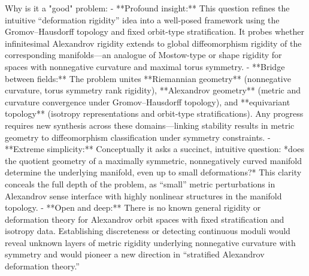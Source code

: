 Why is it a "good" problem:  
- **Profound insight:** This question refines the intuitive “deformation rigidity” idea into a well-posed framework using the Gromov–Hausdorff topology and fixed orbit-type stratification. It probes whether infinitesimal Alexandrov rigidity extends to global diffeomorphism rigidity of the corresponding manifolds—an analogue of Mostow-type or shape rigidity for spaces with nonnegative curvature and maximal torus symmetry.  
- **Bridge between fields:** The problem unites **Riemannian geometry** (nonnegative curvature, torus symmetry rank rigidity), **Alexandrov geometry** (metric and curvature convergence under Gromov–Hausdorff topology), and **equivariant topology** (isotropy representations and orbit-type stratifications). Any progress requires new synthesis across these domains—linking stability results in metric geometry to diffeomorphism classification under symmetry constraints.  
- **Extreme simplicity:** Conceptually it asks a succinct, intuitive question: *does the quotient geometry of a maximally symmetric, nonnegatively curved manifold determine the underlying manifold, even up to small deformations?* This clarity conceals the full depth of the problem, as “small” metric perturbations in Alexandrov sense interface with highly nonlinear structures in the manifold topology.  
- **Open and deep:** There is no known general rigidity or deformation theory for Alexandrov orbit spaces with fixed stratification and isotropy data. Establishing discreteness or detecting continuous moduli would reveal unknown layers of metric rigidity underlying nonnegative curvature with symmetry and would pioneer a new direction in “stratified Alexandrov deformation theory.”